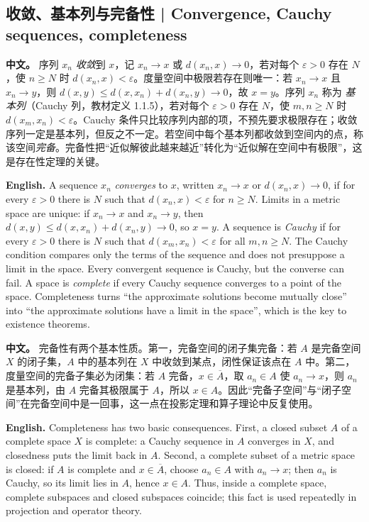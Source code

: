 \documentclass[UTF8,11pt,a4paper]{ctexart}
\newcommand{\APS}[2]{\par\noindent\textbf{中文。} #1\par\noindent\textbf{English.} #2\par\smallskip}
\begin{document}
\subsection{收敛、基本列与完备性 | Convergence, Cauchy sequences, completeness}
\APS{序列 $x_n$ \emph{收敛}到 $x$，记 $x_n\to x$ 或 $d(x_n,x)\to0$，若对每个 $\varepsilon>0$ 存在 $N$，使 $n\ge N$ 时 $d(x_n,x)<\varepsilon$。度量空间中极限若存在则唯一：若 $x_n\to x$ 且 $x_n\to y$，则 $d(x,y)\le d(x,x_n)+d(x_n,y)\to0$，故 $x=y$。序列 $x_n$ 称为 \emph{基本列}（Cauchy 列，教材定义 1.1.5），若对每个 $\varepsilon>0$ 存在 $N$，使 $m,n\ge N$ 时 $d(x_m,x_n)<\varepsilon$。Cauchy 条件只比较序列内部的项，不预先要求极限存在；收敛序列一定是基本列，但反之不一定。若空间中每个基本列都收敛到空间内的点，称该空间\emph{完备}。完备性把“近似解彼此越来越近”转化为“近似解在空间中有极限”，这是存在性定理的关键。}{A sequence $x_n$ \emph{converges} to $x$, written $x_n\to x$ or $d(x_n,x)\to0$, if for every $\varepsilon>0$ there is $N$ such that $d(x_n,x)<\varepsilon$ for $n\ge N$. Limits in a metric space are unique: if $x_n\to x$ and $x_n\to y$, then $d(x,y)\le d(x,x_n)+d(x_n,y)\to0$, so $x=y$. A sequence is \emph{Cauchy} if for every $\varepsilon>0$ there is $N$ such that $d(x_m,x_n)<\varepsilon$ for all $m,n\ge N$. The Cauchy condition compares only the terms of the sequence and does not presuppose a limit in the space. Every convergent sequence is Cauchy, but the converse can fail. A space is \emph{complete} if every Cauchy sequence converges to a point of the space. Completeness turns ``the approximate solutions become mutually close'' into ``the approximate solutions have a limit in the space'', which is the key to existence theorems.}

\APS{完备性有两个基本性质。第一，完备空间的闭子集完备：若 $A$ 是完备空间 $X$ 的闭子集，$A$ 中的基本列在 $X$ 中收敛到某点，闭性保证该点在 $A$ 中。第二，度量空间的完备子集必为闭集：若 $A$ 完备，$x\in\overline A$，取 $a_n\in A$ 使 $a_n\to x$，则 $a_n$ 是基本列，由 $A$ 完备其极限属于 $A$，所以 $x\in A$。因此“完备子空间”与“闭子空间”在完备空间中是一回事，这一点在投影定理和算子理论中反复使用。}{Completeness has two basic consequences. First, a closed subset $A$ of a complete space $X$ is complete: a Cauchy sequence in $A$ converges in $X$, and closedness puts the limit back in $A$. Second, a complete subset of a metric space is closed: if $A$ is complete and $x\in\overline A$, choose $a_n\in A$ with $a_n\to x$; then $a_n$ is Cauchy, so its limit lies in $A$, hence $x\in A$. Thus, inside a complete space, complete subspaces and closed subspaces coincide; this fact is used repeatedly in projection and operator theory.}
\end{document}
